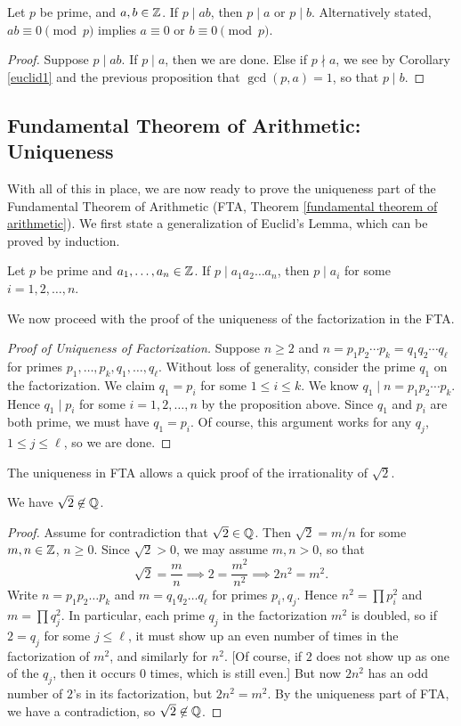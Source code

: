 \documentclass{article}
\begin{document}
\begin{theorem}\label{euclid's lemma}
Let $p$ be prime, and $a,b\in\mathbb Z$. If $p\mid ab$, then $p\mid a$ or $p\mid b$. Alternatively stated, $ab\equiv 0\pmod p$ implies $a\equiv 0$ or $b\equiv 0\pmod p$.
\end{theorem}
\begin{proof}
Suppose $p\mid ab$. If $p\mid a$, then we are done. Else if $p\nmid a$, we see by Corollary \ref{euclid1} and the previous proposition that $\gcd(p, a)=1$, so that $p\mid b$.
\end{proof}

\newpage
\subsection*{Fundamental Theorem of Arithmetic: Uniqueness}
With all of this in place, we are now ready to prove the uniqueness part of the Fundamental Theorem of Arithmetic (FTA, Theorem \ref{fundamental theorem of arithmetic}). We first state a generalization of Euclid's Lemma, which can be proved by induction.
\begin{proposition}
Let $p$ be prime and $a_1,\ldots, a_n\in\mathbb Z$. If $p \mid a_1a_2\ldots a_n$, then $p\mid a_i$ for some $i = 1,2, \ldots, n$.
\end{proposition}

We now proceed with the proof of the uniqueness of the factorization in the FTA.
\begin{proof}[Proof of Uniqueness of Factorization]
Suppose $n\geq 2$ and $n = p_1p_2\cdots p_k = q_1q_2\cdots q_\ell$ for primes $p_1,\ldots, p_k, q_1,\ldots, q_\ell$. Without loss of generality, consider the prime $q_1$ on the factorization. We claim $q_1 = p_i$ for some $1\leq i \leq k$. We know $q_1\mid n = p_1p_2 \cdots p_k$. Hence $q_1\mid p_i$ for some $i = 1, 2, \ldots, n$ by the proposition above. Since $q_1$ and $p_i$ are both prime, we must have $q_1 = p_i$. Of course, this argument works for any $q_j$, $1\leq j \leq \ell$, so we are done.
\end{proof}

The uniqueness in FTA allows a quick proof of the irrationality of $\sqrt 2$.
\begin{theorem}
We have $\sqrt 2\not\in\mathbb Q$.
\end{theorem}
\begin{proof}
Assume for contradiction that $\sqrt 2\in\mathbb Q$. Then $\sqrt 2 = m/n$ for some $m,n\in\mathbb Z$, $n\geq 0$. Since $\sqrt 2 > 0$, we may assume $m,n > 0$, so that
$$\sqrt 2=\frac mn \implies 2 = \frac{m^2}{n^2} \implies 2n^2 = m^2.$$
Write $n = p_1p_2\ldots p_k$ and $m = q_1q_2\ldots q_\ell$ for primes $p_i, q_j$. Hence $n^2 = \prod p_i^2$ and $m = \prod q_j^2$. In particular, each prime $q_j$ in the factorization $m^2$ is doubled, so if $2 = q_j$ for some $j\leq \ell$, it must show up an even number of times in the factorization of $m^2$, and similarly for $n^2$. [Of course, if $2$ does not show up as one of the $q_j$, then it occurs $0$ times, which is still even.] But now $2n^2$ has an odd number of $2$'s in its factorization, but $2n^2 = m^2$. By the uniqueness part of FTA, we have a contradiction, so $\sqrt 2\not\in\mathbb Q$.
\end{proof}
\end{document}
